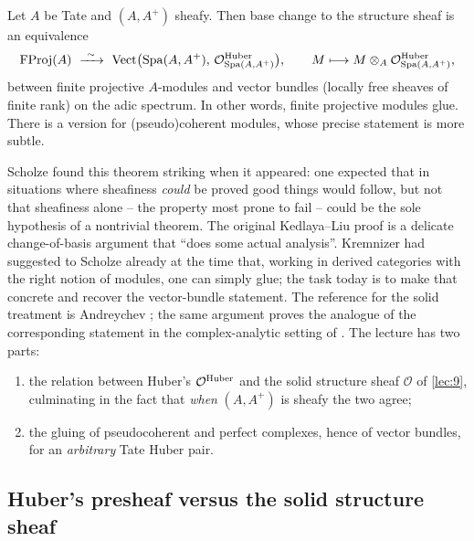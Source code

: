 \begin{theorem}
\label{thm:10:kedlaya-liu}
Let $A$ be Tate and $(A,A^{+})$ sheafy. Then base change to the structure sheaf
is an equivalence
\begin{equation}
\label{eq:10:kedlaya-liu}
\FProj(A)\ \xrightarrow{\ \sim\ }\ \VB\bigl(\Spa(A,A^{+}),\,\Ohub_{\Spa(A,A^{+})}\bigr),
\qquad M\longmapsto M\otimes_{A}\Ohub_{\Spa(A,A^{+})},
\end{equation}
between finite projective $A$-modules and vector bundles (locally free sheaves of
finite rank) on the adic spectrum. In other words, finite projective modules
glue. There is a version for (pseudo)coherent modules, whose precise statement is
more subtle.
\end{theorem}

\begin{remark}
\label{rmk:10:history}
Scholze found this theorem striking when it appeared: one expected that in
situations where sheafiness \emph{could} be proved good things would follow, but
not that sheafiness alone -- the property most prone to fail -- could be the
sole hypothesis of a nontrivial theorem. The original Kedlaya--Liu proof is a
delicate change-of-basis argument that ``does some actual analysis''. Kremnizer
had suggested to Scholze already at the time that, working in derived categories
with the right notion of modules, one can simply glue; the task today is to make
that concrete and recover the vector-bundle statement. The reference for the
solid treatment is Andreychev
\cite{andreychev2021pseudocoherentperfectcomplexesvector}; the same argument
proves the analogue of the corresponding statement in the complex-analytic
setting of \cite{scholze2020analytic}. The lecture has two parts:
\begin{enumerate}
\item the relation between Huber's $\mathcal{O}^{\mathrm{Huber}}$ and the solid structure sheaf $\mathcal O$
of \cref{lec:9}, culminating in the fact that \emph{when} $(A,A^{+})$ is sheafy
the two agree;
\item the gluing of pseudocoherent and perfect complexes, hence of vector
bundles, for an \emph{arbitrary} Tate Huber pair.
\end{enumerate}
\end{remark}

\subsection{Huber's presheaf versus the solid structure sheaf}

